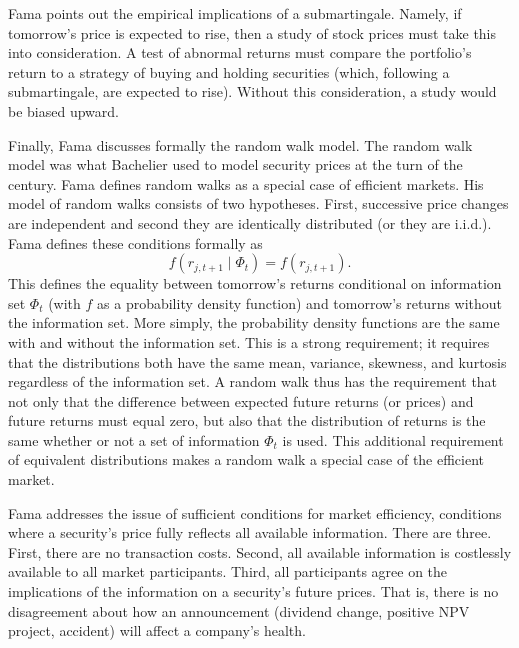 
Fama points out the empirical implications of a submartingale.
Namely, if tomorrow's price is expected to rise, then a study
of
stock prices must take this into consideration.  A test of abnormal
returns must compare the portfolio's return to a strategy of buying
and holding securities (which, following a submartingale, are
expected
to rise).  Without this consideration, a study would be biased
upward.

Finally, Fama discusses formally the random walk model.  The
random walk model was what Bachelier used to model security
prices at the turn of the century.  Fama defines random
walks as a special case of efficient markets.  His model of
random walks consists of two hypotheses.
First, successive price
changes are independent and second they are identically
distributed (or they are i.i.d.).  Fama defines these conditions
formally as
\begin{equation}
f(r_{j,t+1} \mid \Phi_{t})=f(r_{j,t+1}).
\end{equation}
This defines the equality between tomorrow's returns conditional on
information set $\Phi_{t}$
(with $f$ as a probability density function) and
tomorrow's returns without the information set.  More simply, the
probability density functions are the same with and without the
information set.  This is a strong requirement; it requires that
the
distributions both have the same mean, variance, skewness, and
kurtosis  regardless of the information set.
A random walk thus has the requirement that not only that the
difference between expected future returns (or prices) and future
returns must equal zero, but also that the distribution of returns
is
the same whether or not a set of information $\Phi_{t}$ is used. 
This
additional requirement of equivalent distributions makes a random
walk a special case of the efficient market.

Fama addresses the issue of sufficient conditions for market
efficiency, conditions where a security's price fully reflects all
available information.  There are three.  First, there are no
transaction costs.  Second, all available information is costlessly
available to all market participants.  Third, all participants
agree
on the implications of the information on a security's future
prices.
That is, there is no disagreement about how an announcement
(dividend
change, positive NPV project, accident) will affect a company's
health.

